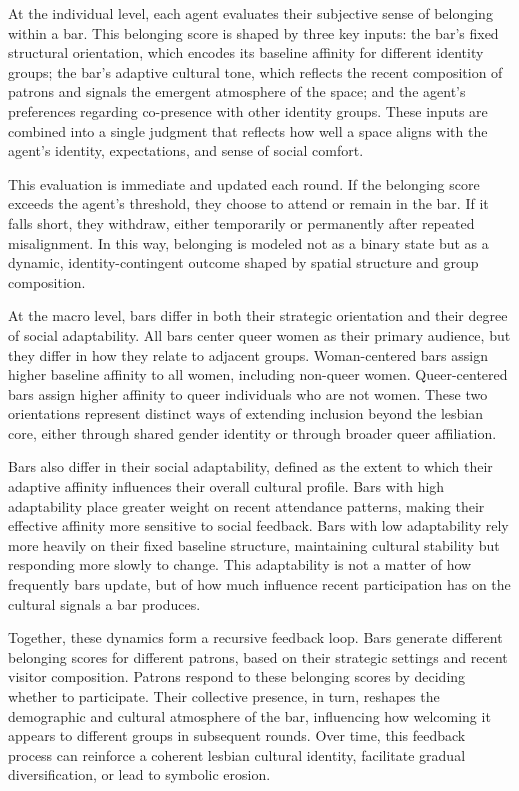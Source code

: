 \documentclass{article}
\begin{document}
At the individual level, each agent evaluates their subjective sense of belonging within a bar. This belonging score is shaped by three key inputs: the bar’s fixed structural orientation, which encodes its baseline affinity for different identity groups; the bar’s adaptive cultural tone, which reflects the recent composition of patrons and signals the emergent atmosphere of the space; and the agent’s preferences regarding co-presence with other identity groups. These inputs are combined into a single judgment that reflects how well a space aligns with the agent’s identity, expectations, and sense of social comfort.

This evaluation is immediate and updated each round. If the belonging score exceeds the agent’s threshold, they choose to attend or remain in the bar. If it falls short, they withdraw, either temporarily or permanently after repeated misalignment. In this way, belonging is modeled not as a binary state but as a dynamic, identity-contingent outcome shaped by spatial structure and group composition.

At the macro level, bars differ in both their strategic orientation and their degree of social adaptability. All bars center queer women as their primary audience, but they differ in how they relate to adjacent groups. Woman-centered bars assign higher baseline affinity to all women, including non-queer women. Queer-centered bars assign higher affinity to queer individuals who are not women. These two orientations represent distinct ways of extending inclusion beyond the lesbian core, either through shared gender identity or through broader queer affiliation.

Bars also differ in their social adaptability, defined as the extent to which their adaptive affinity influences their overall cultural profile. Bars with high adaptability place greater weight on recent attendance patterns, making their effective affinity more sensitive to social feedback. Bars with low adaptability rely more heavily on their fixed baseline structure, maintaining cultural stability but responding more slowly to change. This adaptability is not a matter of how frequently bars update, but of how much influence recent participation has on the cultural signals a bar produces.

Together, these dynamics form a recursive feedback loop. Bars generate different belonging scores for different patrons, based on their strategic settings and recent visitor composition. Patrons respond to these belonging scores by deciding whether to participate. Their collective presence, in turn, reshapes the demographic and cultural atmosphere of the bar, influencing how welcoming it appears to different groups in subsequent rounds. Over time, this feedback process can reinforce a coherent lesbian cultural identity, facilitate gradual diversification, or lead to symbolic erosion.
\end{document}
